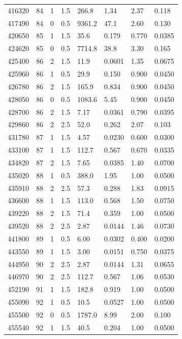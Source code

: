 \documentclass[preview]{standalone}
\begin{document}
{{{{{{{\begin{tabular}{L{1.2cm}C{1.2cm} C{0.3cm}C{0.5cm} C{1.4cm}C{1.4cm} C{1.4cm}C{1.4cm}}
  416320  &    84  & 1     & 1.5 &  266.8  & 1.34  & 2.37 &  0.118   \\ 
  417490  &    84  & 0     & 0.5 &  9361.2  & 47.1  & 2.60 &  0.130   \\ 
  420650  &    85  & 1     & 1.5 &  35.6  & 0.179  & 0.770 &  0.0385   \\ 
  424620  &    85  & 0     & 0.5 &  7714.8  & 38.8  & 3.30 &  0.165   \\ 
  425400  &    86  & 2     & 1.5 &  11.9  & 0.0601  & 1.35 &  0.0675   \\ 
  425960  &    86  & 1     & 0.5 &  29.9  & 0.150  & 0.900 &  0.0450   \\ 
  426780  &    86  & 2     & 1.5 &  165.9  & 0.834  & 0.900 &  0.0450   \\ 
  428050  &    86  & 0     & 0.5 &  1083.6  & 5.45  & 0.900 &  0.0450   \\ 
  428700  &    86  & 2     & 1.5 &  7.17  & 0.0361  & 0.790 &  0.0395   \\ 
  429860  &    86  & 2     & 2.5 &  52.0  & 0.262  & 2.07 &  0.103   \\ 
  431780  &    87  & 1     & 1.5 &  4.57  & 0.0230  & 0.600 &  0.0300   \\ 
  433100  &    87  & 1     & 1.5 &  112.7  & 0.567  & 0.670 &  0.0335   \\ 
  434820  &    87  & 2     & 1.5 &  7.65  & 0.0385  & 1.40 &  0.0700   \\ 
  435020  &    88  & 1     & 0.5 &  388.0  & 1.95  & 1.00 &  0.0500   \\ 
  435910  &    88  & 2     & 2.5 &  57.3  & 0.288  & 1.83 &  0.0915   \\ 
  436600  &    88  & 1     & 1.5 &  113.0  & 0.568  & 1.50 &  0.0750   \\ 
  439220  &    88  & 2     & 1.5 &  71.4  & 0.359  & 1.00 &  0.0500   \\ 
  439520  &    88  & 2     & 2.5 &  2.87  & 0.0144  & 1.46 &  0.0730   \\ 
  441800  &    89  & 1     & 0.5 &  6.00  & 0.0302  & 0.400 &  0.0200   \\ 
  443550  &    89  & 1     & 1.5 &  3.00  & 0.0151  & 0.750 &  0.0375   \\ 
  444950  &    90  & 2     & 2.5 &  2.87  & 0.0144  & 1.31 &  0.0655   \\ 
  446970  &    90  & 2     & 2.5 &  112.7  & 0.567  & 1.06 &  0.0530   \\ 
  452190  &    91  & 1     & 1.5 &  182.8  & 0.919  & 1.00 &  0.0500   \\ 
  455090  &    92  & 1     & 0.5 &  10.5  & 0.0527  & 1.00 &  0.0500   \\ 
  455500  &    92  & 0     & 0.5 &  1787.0  & 8.99  & 2.00 &  0.100   \\ 
  455540  &    92  & 1     & 1.5 &  40.5  & 0.204  & 1.00 &  0.0500   \\ 
\hline 
\end{tabular} 

}}}}}}}
\end{document}
